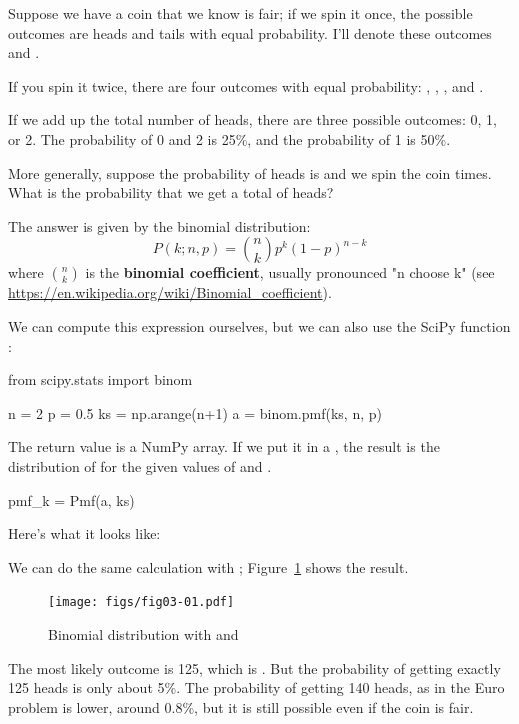 \documentclass[12pt]{book}
\theoremstyle{exercise}
\begin{document}
Suppose we have a coin that we know is fair; if we spin it once, the possible outcomes are heads and tails with equal probability.
I'll denote these outcomes  and .

If you spin it twice, there are four outcomes with equal probability: , , , and . 

If we add up the total number of heads, there are three possible outcomes: 0, 1, or 2.  The probability of 0 and 2 is 25\%, and the probability of 1 is 50\%.

More generally, suppose the probability of heads is  and we spin the coin  times.  What is the probability that we get a total of  heads?

The answer is given by the binomial distribution:
%
\[ P(k; n, p) = \binom{n}{k} p^k (1-p)^{n-k} \]
%
where $\binom{n}{k}$ is the {\bf binomial coefficient}, usually pronounced "n choose k" (see \url{https://en.wikipedia.org/wiki/Binomial_coefficient}).

We can compute this expression ourselves, but we can also use the SciPy function :

\begin{code}
from scipy.stats import binom

n = 2
p = 0.5
ks = np.arange(n+1)
a = binom.pmf(ks, n, p)
\end{code}

The return value is a NumPy array.
If we put it in a , the result is the distribution of  for the given values of  and .

\begin{code}
pmf_k = Pmf(a, ks)
\end{code}

Here's what it looks like:



We can do the same calculation with ; Figure~\ref{fig03-01} shows the result.

\begin{figure}
\centerline{\texttt{[image: figs/fig03-01.pdf]}}
\caption{Binomial distribution with  and }
\label{fig03-01}
\end{figure}

The most likely outcome is 125, which is .
But the probability of getting exactly 125 heads is only about 5\%.
The probability of getting 140 heads, as in the Euro problem is lower, around 0.8\%, but it is still possible even if the coin is fair.
\end{document}
